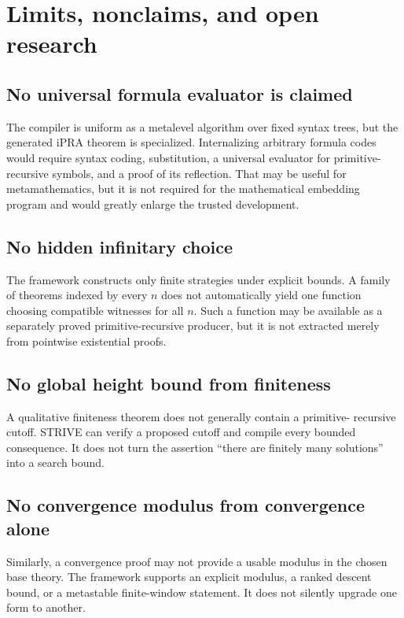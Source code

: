 \section{Limits, nonclaims, and open research}

\subsection{No universal formula evaluator is claimed}

The compiler is uniform as a metalevel algorithm over fixed syntax trees, but
the generated iPRA theorem is specialized.  Internalizing arbitrary formula
codes would require syntax coding, substitution, a universal evaluator for
primitive-recursive symbols, and a proof of its reflection.  That may be useful
for metamathematics, but it is not required for the mathematical embedding
program and would greatly enlarge the trusted development.

\subsection{No hidden infinitary choice}

The framework constructs only finite strategies under explicit bounds.  A
family of theorems indexed by every \(n\) does not automatically yield one
function choosing compatible witnesses for all \(n\).  Such a function may be
available as a separately proved primitive-recursive producer, but it is not
extracted merely from pointwise existential proofs.

\subsection{No global height bound from finiteness}

A qualitative finiteness theorem does not generally contain a primitive-
recursive cutoff.  STRIVE can verify a proposed cutoff and compile every
bounded consequence.  It does not turn the assertion ``there are finitely many
solutions'' into a search bound.

\subsection{No convergence modulus from convergence alone}

Similarly, a convergence proof may not provide a usable modulus in the chosen
base theory.  The framework supports an explicit modulus, a ranked descent
bound, or a metastable finite-window statement.  It does not silently upgrade
one form to another.

